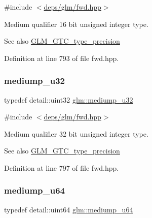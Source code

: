 {\ttfamily \#include $<$\hyperlink{fwd_8hpp}{deps/glm/fwd.\+hpp}$>$}

Medium qualifier 16 bit unsigned integer type. \begin{DoxySeeAlso}{See also}
\hyperlink{group__gtc__type__precision}{G\+L\+M\+\_\+\+G\+T\+C\+\_\+type\+\_\+precision} 
\end{DoxySeeAlso}


Definition at line 793 of file fwd.\+hpp.

\mbox{\label{group__gtc__type__precision_gad0c27a525045c299a92306eb4cd7c13a}} 
\subsubsection{\texorpdfstring{mediump\+\_\+u32}{mediump\_u32}}
{\footnotesize\ttfamily typedef detail\+::uint32 \hyperlink{group__gtc__type__precision_gad0c27a525045c299a92306eb4cd7c13a}{glm\+::mediump\+\_\+u32}}



{\ttfamily \#include $<$\hyperlink{fwd_8hpp}{deps/glm/fwd.\+hpp}$>$}

Medium qualifier 32 bit unsigned integer type. \begin{DoxySeeAlso}{See also}
\hyperlink{group__gtc__type__precision}{G\+L\+M\+\_\+\+G\+T\+C\+\_\+type\+\_\+precision} 
\end{DoxySeeAlso}


Definition at line 797 of file fwd.\+hpp.

\mbox{\label{group__gtc__type__precision_ga00c51a16fa190b0a90205d50d6d8a44a}} 
\subsubsection{\texorpdfstring{mediump\+\_\+u64}{mediump\_u64}}
{\footnotesize\ttfamily typedef detail\+::uint64 \hyperlink{group__gtc__type__precision_ga00c51a16fa190b0a90205d50d6d8a44a}{glm\+::mediump\+\_\+u64}}



